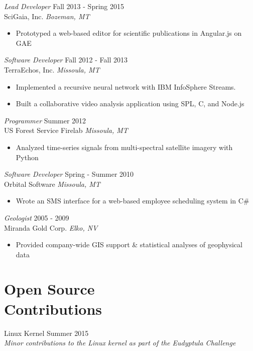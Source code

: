 \documentclass[line,margin]{res}
\begin{document}
\begin{resume}
        {\sl Lead Developer} \hfill  Fall 2013 - Spring 2015\\
        SciGaia, Inc. \hfill {\sl Bozeman, MT}
        \begin{itemize} \itemsep -2pt
            \item Prototyped a web-based editor for scientific publications in Angular.js on GAE
        \end{itemize}

        {\sl Software Developer} \hfill  Fall 2012 - Fall 2013\\
        TerraEchos, Inc. \hfill {\sl Missoula, MT}
        \begin{itemize} \itemsep -2pt
            \item Implemented a recursive neural network with IBM InfoSphere\textsuperscript{\textregistered} Streams.
            \item Built a collaborative video analysis application using SPL, C, and Node.js
        \end{itemize}

        {\sl Programmer} \hfill  Summer 2012\\
        US Forest Service Firelab \hfill {\sl Missoula, MT}
        \begin{itemize} \itemsep -2pt
            \item Analyzed time-series signals from multi-spectral satellite imagery with Python
        \end{itemize}

        {\sl Software Developer} \hfill Spring - Summer 2010\\
        Orbital Software \hfill {\sl Missoula, MT}
        \begin{itemize} \itemsep -2pt
            \item Wrote an SMS interface for a web-based employee scheduling system in C\#
        \end{itemize}

        {\sl Geologist} \hfill 2005 - 2009 \\
        Miranda Gold Corp. \hfill {\sl Elko, NV}
        \begin{itemize}  \itemsep -2pt
            \item Provided company-wide GIS support \& statistical analyses of geophysical data
        \end{itemize}
\section{\sc Open Source\\ Contributions}
        Linux Kernel \hfill Summer 2015\\
            \emph{Minor contributions to the Linux kernel as part of the Eudyptula Challenge}
            

\end{resume}
\end{document}

